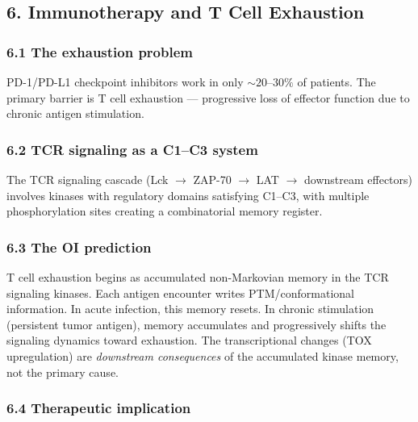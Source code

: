 \documentclass[
]{article}
\begin{document}
\hypertarget{immunotherapy-and-t-cell-exhaustion}{%
\subsection{6. Immunotherapy and T Cell
Exhaustion}\label{immunotherapy-and-t-cell-exhaustion}}

\hypertarget{the-exhaustion-problem}{%
\subsubsection{6.1 The exhaustion
problem}\label{the-exhaustion-problem}}

PD-1/PD-L1 checkpoint inhibitors work in only \(\sim 20\)--\(30\%\) of
patients. The primary barrier is T cell exhaustion --- progressive loss
of effector function due to chronic antigen stimulation.

\hypertarget{tcr-signaling-as-a-c1c3-system}{%
\subsubsection{6.2 TCR signaling as a C1--C3
system}\label{tcr-signaling-as-a-c1c3-system}}

The TCR signaling cascade (Lck \(\to\) ZAP-70 \(\to\) LAT \(\to\)
downstream effectors) involves kinases with regulatory domains
satisfying C1--C3, with multiple phosphorylation sites creating a
combinatorial memory register.

\hypertarget{the-oi-prediction-2}{%
\subsubsection{6.3 The OI prediction}\label{the-oi-prediction-2}}

T cell exhaustion begins as accumulated non-Markovian memory in the TCR
signaling kinases. Each antigen encounter writes PTM/conformational
information. In acute infection, this memory resets. In chronic
stimulation (persistent tumor antigen), memory accumulates and
progressively shifts the signaling dynamics toward exhaustion. The
transcriptional changes (TOX upregulation) are \emph{downstream
consequences} of the accumulated kinase memory, not the primary cause.

\hypertarget{therapeutic-implication-1}{%
\subsubsection{6.4 Therapeutic
implication}\label{therapeutic-implication-1}}
\end{document}
